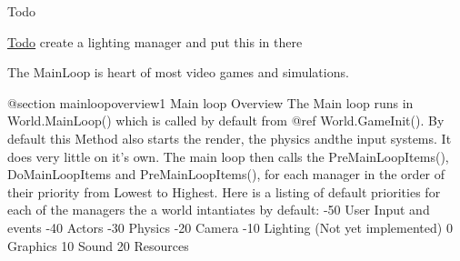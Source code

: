 \begin{DoxyRefDesc}{Todo}
\item[\hyperlink{todo__todo000024}{Todo}]create a lighting manager and put this in there \end{DoxyRefDesc}


\begin{DoxyVerb}    The MainLoop is heart of most video games and simulations.

    @section mainloopoverview1 Main loop Overview
    The Main loop runs in World.MainLoop() which is called by default from @ref World.GameInit(). By default this Method also starts the render, the physics andthe input systems. It does very
    little on it's own. The main loop then calls the PreMainLoopItems(), DoMainLoopItems and PreMainLoopItems(), for each manager in the order of their priority from Lowest to Highest.
    \n Here is a listing of  default priorities for each of the managers the a world intantiates by default:
       -50  User Input and events
       -40  Actors
       -30  Physics
       -20 Camera
       -10 Lighting (Not yet implemented)
         0 Graphics
        10  Sound
        20 Resources\end{DoxyVerb}
 
